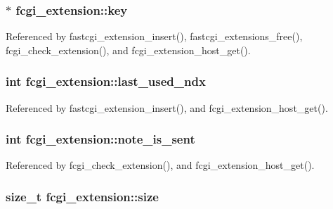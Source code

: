 \hypertarget{structfcgi__extension_ad01e793a5144bf18839c36ce1915edf0}{
\subsubsection[{key}]{$\ast$ fcgi\-\_\-extension\-::key}}\label{structfcgi__extension_ad01e793a5144bf18839c36ce1915edf0}


Referenced by fastcgi\-\_\-extension\-\_\-insert(), fastcgi\-\_\-extensions\-\_\-free(), fcgi\-\_\-check\-\_\-extension(), and fcgi\-\_\-extension\-\_\-host\-\_\-get().

\hypertarget{structfcgi__extension_a29d77acd6c009cc488e6ec9ec2231276}{
\subsubsection[{last\-\_\-used\-\_\-ndx}]{\setlength{\rightskip}{0pt plus 5cm}int fcgi\-\_\-extension\-::last\-\_\-used\-\_\-ndx}}\label{structfcgi__extension_a29d77acd6c009cc488e6ec9ec2231276}


Referenced by fastcgi\-\_\-extension\-\_\-insert(), and fcgi\-\_\-extension\-\_\-host\-\_\-get().

\hypertarget{structfcgi__extension_a34041eea2feaac460ffa873833d7687b}{
\subsubsection[{note\-\_\-is\-\_\-sent}]{\setlength{\rightskip}{0pt plus 5cm}int fcgi\-\_\-extension\-::note\-\_\-is\-\_\-sent}}\label{structfcgi__extension_a34041eea2feaac460ffa873833d7687b}


Referenced by fcgi\-\_\-check\-\_\-extension(), and fcgi\-\_\-extension\-\_\-host\-\_\-get().

\hypertarget{structfcgi__extension_a97ac0e5e8eb55c2b3238a98c9c5e6897}{
\subsubsection[{size}]{\setlength{\rightskip}{0pt plus 5cm}size\-\_\-t fcgi\-\_\-extension\-::size}}\label{structfcgi__extension_a97ac0e5e8eb55c2b3238a98c9c5e6897}


